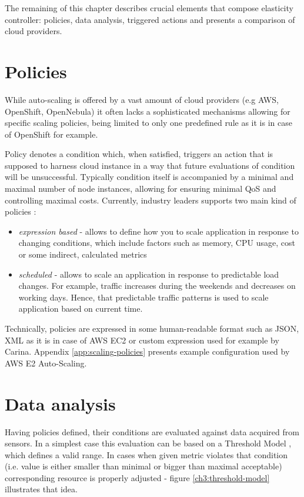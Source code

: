 The remaining of this chapter describes crucial elements that compose elasticity controller: policies, data analysis, triggered actions and presents a comparison of cloud providers.
 
\section{Policies}
While auto-scaling is offered by a vast amount of cloud providers (e.g AWS, OpenShift, OpenNebula) it often lacks a sophisticated mechanisms allowing for specific scaling policies, being limited to only one predefined rule as it is in case of OpenShift for example. 
 
Policy denotes a condition which, when satisfied, triggers an action that is supposed to harness cloud instance in a way that future evaluations of condition will be unsuccessful. Typically condition itself is accompanied by a minimal and maximal number of node instances, allowing for ensuring minimal QoS and controlling maximal costs. Currently, industry leaders supports two main kind of policies \cite{AmazonAutoScaling}:
\begin{itemize}
 \item \textit{expression based} - allows to define how you to scale application in response to changing conditions, which include factors such as memory, CPU usage, cost or some indirect, calculated metrics
 \item \textit{scheduled} - allows to scale an application in response to predictable load changes. For example, traffic increases during the weekends and decreases on working days. Hence, that predictable traffic patterns is used to scale application based on current time.
\end{itemize}

Technically, policies are expressed in some human-readable format such as JSON, XML as it is in case of AWS EC2 or custom expression used for example by Carina. Appendix \ref{app:scaling-policies} presents example configuration used by AWS E2 Auto-Scaling.

\section{Data analysis}
Having policies defined, their conditions are evaluated against data acquired from sensors. In a simplest case this evaluation can be based on a Threshold Model \cite{LiWoZh05}, which defines a valid range. In cases when given metric violates that condition (i.e. value is either smaller than minimal or bigger than maximal acceptable) corresponding resource is properly adjusted - figure \ref{ch3:threshold-model} illustrates that idea.

